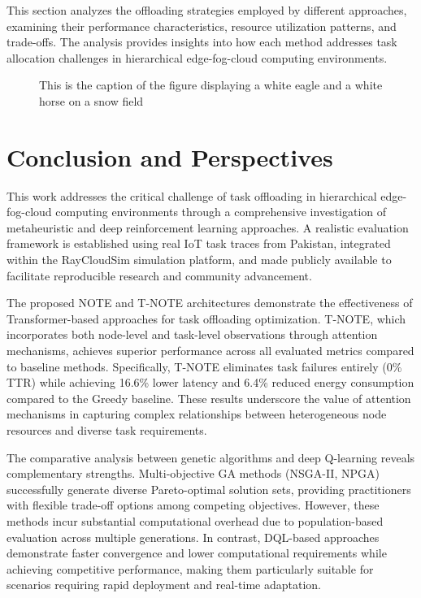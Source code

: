 \documentclass{svproc}
\begin{document}
This section analyzes the offloading strategies employed by different approaches, examining their performance characteristics, resource utilization patterns, and trade-offs. The analysis provides insights into how each method addresses task allocation challenges in hierarchical edge-fog-cloud computing environments.


\begin{figure}
\vspace{2.5cm}
\caption{This is the caption of the figure displaying a white eagle and
a white horse on a snow field}
\end{figure}

\section{Conclusion and Perspectives}\label{sec:conclusion}

This work addresses the critical challenge of task offloading in hierarchical edge-fog-cloud computing environments through a comprehensive investigation of metaheuristic and deep reinforcement learning approaches. A realistic evaluation framework is established using real IoT task traces from Pakistan, integrated within the RayCloudSim simulation platform, and made publicly available to facilitate reproducible research and community advancement.

The proposed NOTE and T-NOTE architectures demonstrate the effectiveness of Transformer-based approaches for task offloading optimization. T-NOTE, which incorporates both node-level and task-level observations through attention mechanisms, achieves superior performance across all evaluated metrics compared to baseline methods. Specifically, T-NOTE eliminates task failures entirely (0\% TTR) while achieving 16.6\% lower latency and 6.4\% reduced energy consumption compared to the Greedy baseline. These results underscore the value of attention mechanisms in capturing complex relationships between heterogeneous node resources and diverse task requirements.

The comparative analysis between genetic algorithms and deep Q-learning reveals complementary strengths. Multi-objective GA methods (NSGA-II, NPGA) successfully generate diverse Pareto-optimal solution sets, providing practitioners with flexible trade-off options among competing objectives. However, these methods incur substantial computational overhead due to population-based evaluation across multiple generations. In contrast, DQL-based approaches demonstrate faster convergence and lower computational requirements while achieving competitive performance, making them particularly suitable for scenarios requiring rapid deployment and real-time adaptation.
\end{document}
